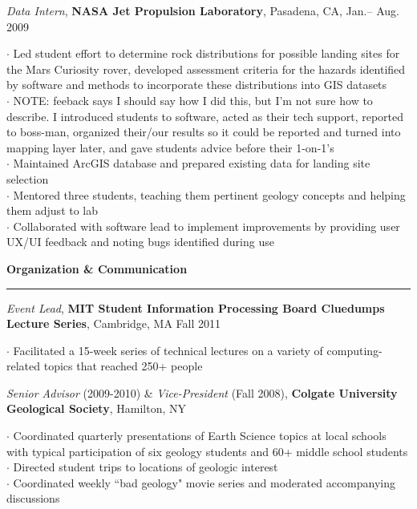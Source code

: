\documentclass[11pt]{article}
\begin{document}
\smallskip
\emph{Data Intern}, \textbf{NASA Jet Propulsion Laboratory}, Pasadena, CA, Jan.-- Aug. 2009 \\
\begin{small}$\cdot$ {Led student effort to determine rock distributions for possible landing sites for the Mars Curiosity rover, developed assessment criteria for the hazards identified by software and methods to incorporate \hspace*{1 mm}these distributions into GIS datasets }\\
$\cdot$ {NOTE: feeback says I should say how I did this, but I'm not sure how to describe. I introduced students to software, acted as their tech support, reported to boss-man, organized their/our results so it could be reported and turned into mapping layer later, and gave students advice before their 1-on-1's}\\ 
$\cdot$ {Maintained ArcGIS database and prepared existing data for landing site selection} \\
$\cdot$ {Mentored three students, teaching them pertinent geology concepts and helping them adjust to lab}\\
$\cdot$ {Collaborated with software lead to implement improvements by providing user UX/UI feedback and noting bugs identified during use}\end{small}

\vspace*{0.25 mm}
\textbf{Organization \& Communication}
\smallskip
\hrule
\emph{Event Lead}, \textbf{MIT Student Information Processing Board Cluedumps Lecture Series}, Cambridge, MA Fall 2011\\
\begin{small}$\cdot$ {Facilitated a 15-week series of technical lectures on a variety of computing-related topics that reached 250+ people}\end{small}

\emph{Senior Advisor} (2009-2010) \& \emph{Vice-President} (Fall 2008), \textbf{Colgate University Geological Society}, Hamilton, NY \\
\begin{small}$\cdot$ {Coordinated quarterly presentations of Earth Science topics at local schools with typical participation of six geology students and 60+ middle school students} \\
$\cdot$ {Directed student trips to locations of geologic interest } \\
$\cdot$ {Coordinated weekly ``bad geology" movie series and moderated accompanying discussions}\end{small}
\end{document}
